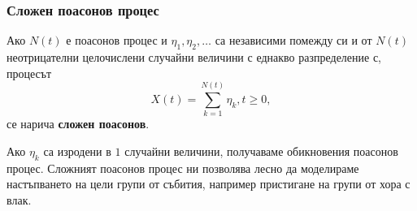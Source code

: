 \documentclass[numbers=endperiod, bibliography=totocnumbered]{scrartcl}
\begin{document}
\subsubsection{Сложен поасонов процес}

\begin{definition}
  Ако \( N(t) \) е поасонов процес и \( \eta_1, \eta_2, \ldots \) са независими помежду си и от \( N(t) \) неотрицателни целочислени случайни величини с еднакво разпределение с, процесът
  \begin{equation*}
    X(t) = \sum_{k=1}^{N(t)} \eta_k, t \geq 0,
  \end{equation*}
  се нарича \textbf{сложен поасонов}.
\end{definition}

\begin{remark}
  Ако \( \eta_k \) са изродени в \( 1 \) случайни величини, получаваме обикновения поасонов процес. Сложният поасонов процес ни позволява лесно да моделираме настъпването на цели групи от събития, например пристигане на групи от хора с влак.
\end{remark}
\end{document}
